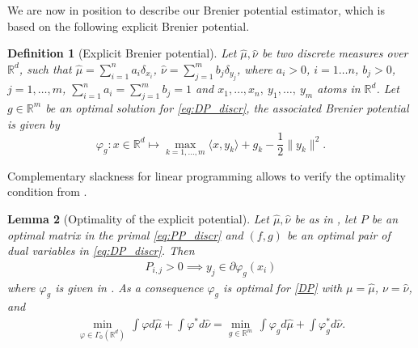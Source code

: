 \documentclass[11pt]{article}
\newtheorem{lemma}{Lemma}[section]
\newtheorem{definition}[lemma]{Definition}
\newcommand{\R}{\mathbb R}
\newcommand{\1}{\mathbbm{1}}
\numberwithin{equation}{section}
\begin{document}
We are now in position to describe our Brenier potential estimator, which is based on the following explicit Brenier potential.
\begin{definition}[Explicit Brenier potential]
    Let $\hat\mu,\hat\nu$ be two discrete measures over $\R^d$, such that $\hat\mu=\sum_{i=1}^na_i\delta_{x_i}$, $\hat\nu=\sum_{j=1}^mb_j\delta_{y_j}$, where $a_i> 0$, $i=1 \ldots n$, $b_j>0$, $j=1,\ldots, m$, $\sum_{i=1}^na_i= \sum_{j=1}^mb_j=1$ and $x_1,\ldots,x_n,\:y_1,\ldots,\:y_m$  atoms in $\R^d$. Let $g \in \R^m$ be an optimal solution for \eqref{eq:DP_discr}, the associated Brenier potential is given by
    \begin{equation}\label{eq:brenier_potential}
        \varphi_g \colon x \in\R^d\mapsto \max_{k=1,\ldots,m}\langle x,y_k \rangle+g_k-\frac{1}{2}\|y_k\|^2.
    \end{equation}
    \label{def:mainEstimator}
\end{definition}
Complementary slackness for linear programming allows to verify the optimality condition from .
\begin{lemma}[Optimality of the explicit potential]
	Let $\hat\mu,\hat\nu$ be as in , let $P$ be an optimal matrix in the primal \eqref{eq:PP_discr} and $(f,g)$ be an optimal pair of dual variables in \eqref{eq:DP_discr}. Then 
	\begin{align*}
		P_{i,j}>0\implies y_j\in \partial\varphi_g(x_i)
	\end{align*}
	where $\varphi_g$ is given in . As a consequence $\varphi_g$ is optimal for \eqref{DP} with $\mu = \hat\mu$, $\nu =  \hat\nu$, and
    \begin{align*}
        \min_{\varphi\in \Gamma_0(\R^d)}\, \int \varphi d\hat\mu + \int\varphi^* d\hat\nu = \min_{g \in \R^m}\, \int \varphi_g d\hat\mu + \int\varphi_g^* d\hat\nu.
    \end{align*}
    \label{lem:explicitBrenierPotential}
\end{lemma}
\end{document}
